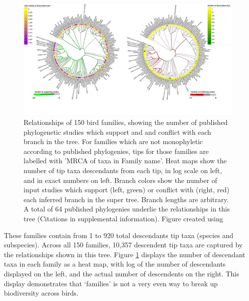 \documentclass[oupdraft]{sysbio_sse}
\begin{document}
\begin{figure}[!p]
\centering\includegraphics[width=\textwidth]{bird_fam_fig}

\caption{Relationships of 150 bird families, showing the number of published phylogenetic studies which support and and conflict with each branch in the tree. For families which are not monophyletic according to published phylogenies, tips for those families are labelled with 'MRCA of taxa in Family name'. Heat maps show the number of tip taxa descendants from each tip, in log scale on left, and in exact numbers on left. Branch colors show the number of input studies which support (left, green) or conflict with (right, red) each inferred branch in the super tree. Branch lengths are arbitrary. A total of 64 published phylogenies underlie the relationships in this tree (Citations in supplemental information). Figure created using \citep{letunic_interactive_2019}}
\label{birdfams}
\end{figure}

These families contain from 1 to 920 total descendants tip taxa (species and subspecies).
Across all 150 families, 10,357 descendent tip taxa  are captured by the relationships shown in this tree.
Figure \ref{birdfams} displays the number of descendant taxa in each family as a heat map, with log of the number of descendants displayed on the left, and the actual number of descendents on the right.
This display demonstrates that `families' is not a very even way to break up biodiversity across birds.
\end{document}

